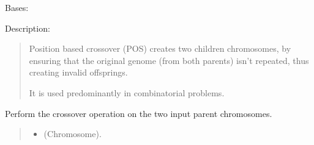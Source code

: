 \documentclass[letterpaper,10pt,english]{sphinxmanual}
\begin{document}
\begin{fulllineitems}
\label{\detokenize{pygenalgo.operators.crossover:pygenalgo.operators.crossover.position_based_crossover.PositionBasedCrossover}}
\pysigstartsignatures
\pysiglinewithargsret
{}
{}
{}
\pysigstopsignatures
\sphinxAtStartPar
Bases: {\hyperref[\detokenize{pygenalgo.operators.crossover:pygenalgo.operators.crossover.crossover_operator.CrossoverOperator}]{}}

\sphinxAtStartPar
Description:
\begin{quote}

\sphinxAtStartPar
Position based crossover (POS) creates two children chromosomes, by ensuring that the
original genome (from both parents) isn’t repeated, thus creating invalid offsprings.

\sphinxAtStartPar
It is used predominantly in combinatorial problems.
\end{quote}

\begin{fulllineitems}
\label{\detokenize{pygenalgo.operators.crossover:pygenalgo.operators.crossover.position_based_crossover.PositionBasedCrossover.crossover}}
\pysigstartsignatures
\pysiglinewithargsret
{}
{\sphinxparamcomma {}}
{}
\pysigstopsignatures
\sphinxAtStartPar
Perform the crossover operation on the two input parent chromosomes.
\begin{quote}\begin{description}
\begin{itemize}
\item {} 
\sphinxAtStartPar
{} \textendash{} (Chromosome).


\end{itemize}
\end{description}
\end{quote}
\end{fulllineitems}
\end{fulllineitems}
\end{document}
